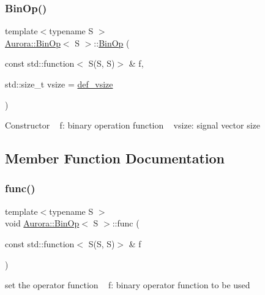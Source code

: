 \subsubsection{\texorpdfstring{Bin\+Op()}{BinOp()}}
{\footnotesize\ttfamily template$<$typename S $>$ \\
\hyperlink{class_aurora_1_1_bin_op}{Aurora\+::\+Bin\+Op}$<$ S $>$\+::\hyperlink{class_aurora_1_1_bin_op}{Bin\+Op} (\begin{DoxyParamCaption}\item[{const std\+::function$<$ S(S, S)$>$ \&}]{f,  }\item[{std\+::size\+\_\+t}]{vsize = {\ttfamily \hyperlink{namespace_aurora_afaaddf667a06e7ce23c667a8b7295263}{def\+\_\+vsize}} }\end{DoxyParamCaption})\hspace{0.3cm}{\ttfamily [inline]}}

Constructor ~\newline
f\+: binary operation function ~\newline
vsize\+: signal vector size 

\subsection{Member Function Documentation}
\mbox{\label{class_aurora_1_1_bin_op_aa440ae97cd1e9f0e1aaa077a57850f3d}} 
\subsubsection{\texorpdfstring{func()}{func()}}
{\footnotesize\ttfamily template$<$typename S $>$ \\
void \hyperlink{class_aurora_1_1_bin_op}{Aurora\+::\+Bin\+Op}$<$ S $>$\+::func (\begin{DoxyParamCaption}\item[{const std\+::function$<$ S(S, S)$>$ \&}]{f }\end{DoxyParamCaption})\hspace{0.3cm}{\ttfamily [inline]}}

set the operator function ~\newline
f\+: binary operator function to be used \mbox{\label{class_aurora_1_1_bin_op_aef7a0a9a5daa40c22e540f08ca928fab}} 
